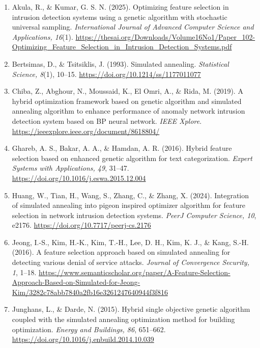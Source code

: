 \documentclass[letterpaper]{article} %
\begin{document}
\begin{enumerate}

    \item \label{akula2025} Akula, R., \& Kumar, G. S. N. (2025). Optimizing feature selection in intrusion detection systems using a genetic algorithm with stochastic universal sampling. \textit{International Journal of Advanced Computer Science and Applications, 16}(1). \url{https://thesai.org/Downloads/Volume16No1/Paper_102-Optimizing_Feature_Selection_in_Intrusion_Detection_Systems.pdf}

    \item \label{bertsimas1993} Bertsimas, D., \& Tsitsiklis, J. (1993). Simulated annealing. \textit{Statistical Science, 8}(1), 10--15. \url{https://doi.org/10.1214/ss/1177011077}

    \item \label{chiba2019} Chiba, Z., Abghour, N., Moussaid, K., El Omri, A., \& Rida, M. (2019). A hybrid optimization framework based on genetic algorithm and simulated annealing algorithm to enhance performance of anomaly network intrusion detection system based on BP neural network. \textit{IEEE Xplore}. \url{https://ieeexplore.ieee.org/document/8618804/}

    \item \label{ghareb2016} Ghareb, A. S., Bakar, A. A., \& Hamdan, A. R. (2016). Hybrid feature selection based on enhanced genetic algorithm for text categorization. \textit{Expert Systems with Applications, 49}, 31--47. \url{https://doi.org/10.1016/j.eswa.2015.12.004}

    \item \label{huang2024} Huang, W., Tian, H., Wang, S., Zhang, C., \& Zhang, X. (2024). Integration of simulated annealing into pigeon inspired optimizer algorithm for feature selection in network intrusion detection systems. \textit{PeerJ Computer Science, 10}, e2176. \url{https://doi.org/10.7717/peerj-cs.2176}

    \item \label{jeong2016} Jeong, I.-S., Kim, H.-K., Kim, T.-H., Lee, D. H., Kim, K. J., \& Kang, S.-H. (2016). A feature selection approach based on simulated annealing for detecting various denial of service attacks. \textit{Journal of Convergence Security, 1}, 1--18. \url{https://www.semanticscholar.org/paper/A-Feature-Selection-Approach-Based-on-Simulated-for-Jeong-Kim/3282c78abb7840a2fb16e3261247640944f3f816}

    \item \label{junghans2015} Junghans, L., \& Darde, N. (2015). Hybrid single objective genetic algorithm coupled with the simulated annealing optimization method for building optimization. \textit{Energy and Buildings, 86}, 651--662. \url{https://doi.org/10.1016/j.enbuild.2014.10.039}

\end{enumerate}
\end{document}
